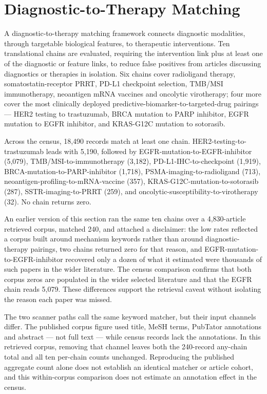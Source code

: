 \documentclass[11pt,twoside,openright]{report}
\begin{document}
\section{Diagnostic-to-Therapy Matching}

A diagnostic-to-therapy matching framework connects diagnostic modalities, through targetable biological features, to therapeutic interventions. Ten translational chains are evaluated, requiring the intervention link plus at least one of the diagnostic or feature links, to reduce false positives from articles discussing diagnostics or therapies in isolation. Six chains cover radioligand therapy, somatostatin-receptor PRRT, PD-L1 checkpoint selection, TMB/MSI immunotherapy, neoantigen mRNA vaccines and oncolytic virotherapy; four more cover the most clinically deployed predictive-biomarker-to-targeted-drug pairings --- HER2 testing to trastuzumab, BRCA mutation to PARP inhibitor, EGFR mutation to EGFR inhibitor, and KRAS-G12C mutation to sotorasib.

Across the census, 18,490 records match at least one chain. HER2-testing-to-trastuzumab leads with 5,190, followed by EGFR-mutation-to-EGFR-inhibitor (5,079), TMB/MSI-to-immunotherapy (3,182), PD-L1-IHC-to-checkpoint (1,919), BRCA-mutation-to-PARP-inhibitor (1,718), PSMA-imaging-to-radioligand (713), neoantigen-profiling-to-mRNA-vaccine (357), KRAS-G12C-mutation-to-sotorasib (287), SSTR-imaging-to-PRRT (259), and oncolytic-susceptibility-to-virotherapy (32). No chain returns zero.

An earlier version of this section ran the same ten chains over a 4,830-article retrieved corpus, matched 240, and attached a disclaimer: the low rates reflected a corpus built around mechanism keywords rather than around diagnostic-therapy pairings, two chains returned zero for that reason, and EGFR-mutation-to-EGFR-inhibitor recovered only a dozen of what it estimated were thousands of such papers in the wider literature. The census comparison confirms that both corpus zeros are populated in the wider selected literature and that the EGFR chain reads 5,079. These differences support the retrieval caveat without isolating the reason each paper was missed.

The two scanner paths call the same keyword matcher, but their input channels differ. The published corpus figure used title, MeSH terms, PubTator annotations and abstract --- not full text --- while census records lack the annotations. In this retrieved corpus, removing that channel leaves both the 240-record any-chain total and all ten per-chain counts unchanged. Reproducing the published aggregate count alone does not establish an identical matcher or article cohort, and this within-corpus comparison does not estimate an annotation effect in the census.
\end{document}
